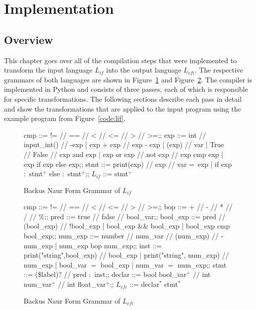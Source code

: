 \section{Implementation}

\subsection{Overview}
This chapter goes over all of the compilation steps that were implemented to transform the input language $L_{if}$ into the output language $L_{cfi}$. 
The respective grammars of both languages are shown in Figure~\ref{bnf:lif} and Figure~\ref{bnf:lcfi}.
The compiler is implemented in Python and consists of three passes, each of which is responsible for specific transformations.
The following sections describe each pass in detail and show the transformations that are applied to the input program using the example program from Figure~\ref{code:lif}.

\begin{figure}[h]
	\centering
	\begin{bnf}[row{-} = {bg = gray9}]
		cmp ::= != // == // < // <= // > // >=;;
		exp ::= int // input\_int() // -exp
		| exp + exp // exp - exp
		| (exp) // var
		| True // False // exp and exp
		| exp or exp // not exp // exp cmp exp
		| exp if exp else exp;;
		stmt ::= print(exp) // exp // var = exp
		| if exp $\colon$ stmt$^+$ else $\colon$ stmt$^+$;;
		$L_{if}$ ::= stmt$^+$
	\end{bnf}
	\caption{Backus Naur Form Grammar of $L_{if}$}
	\label{bnf:lif}
\end{figure}

\begin{figure}[h]
	\centering
	\begin{bnf}[row{-} = {bg = gray9}]
		cmp ::= != // == // < // <= // > // >=;;
		bop ::= + // - // * // / // \%;;
		pred ::= true // false // bool\_var;;
		bool\_exp ::= pred // (bool\_exp) // !bool\_exp
		| bool\_exp \&\& bool\_exp
		| bool\_exp cmp bool\_exp;;
		num\_exp ::= number // num\_var // (num\_exp) // -num\_exp
		| num\_exp bop num\_exp;;
		inst ::= print("string",bool\_exp) // bool\_exp
		| print("string", num\_exp) // num\_exp
		| bool\_var $=$ bool\_exp
		| num\_var $=$ num\_exp;;
		stmt ::= (\$label)? // pred $\colon$ inst;;
		declar ::= bool bool\_var$^+$ // int num\_var$^+$ // int float\_var$^+$;;
		$L_{cfi}$ ::= declar$^*$ stmt$^*$
	\end{bnf}
	\caption{Backus Naur Form Grammar of $L_{cfi}$}
	\label{bnf:lcfi}
\end{figure}

